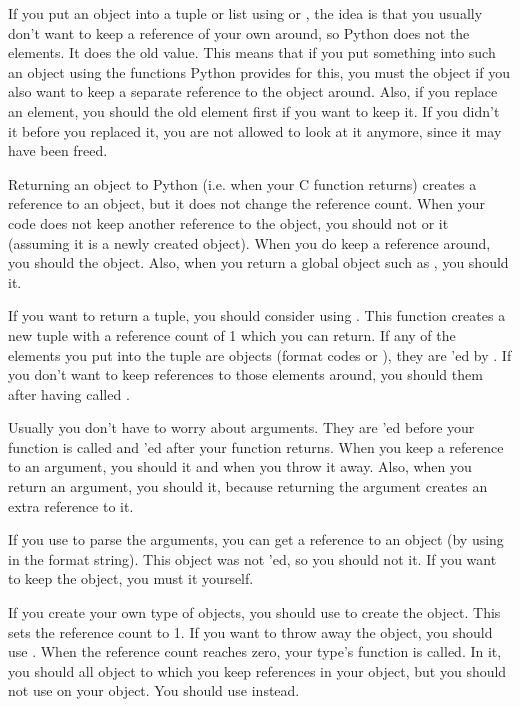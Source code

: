 If you put an object into a tuple or list using 
or , the idea is that you usually don't want to
keep a reference of your own around, so Python does not
 the elements.  It does  the old value.
This means that if you put something into such an object using the
functions Python provides for this, you must  the
object if you also want to keep a separate reference to the object around.
Also, if you replace an element, you should  the old
element first if you want to keep it.  If you didn't 
it before you replaced it, you are not allowed to look at it anymore,
since it may have been freed.

Returning an object to Python (i.e. when your C function returns)
creates a reference to an object, but it does not change the reference
count.  When your code does not keep another reference to the object,
you should not  or  it (assuming it is a
newly created object).  When you do keep a reference around, you
should  the object.  Also, when you return a global
object such as , you should  it.

If you want to return a tuple, you should consider using
.  This function creates a new tuple with a reference
count of 1 which you can return.  If any of the elements you put into
the tuple are objects (format codes  or ), they
are 'ed by .  If you don't want to keep
references to those elements around, you should  them
after having called .

Usually you don't have to worry about arguments.  They are
'ed before your function is called and
'ed after your function returns.  When you keep a
reference to an argument, you should  it and
 when you throw it away.  Also, when you return an
argument, you should  it, because returning the
argument creates an extra reference to it.

If you use  to parse the arguments, you can get a
reference to an object (by using  in the format string).  This
object was not 'ed, so you should not 
it.  If you want to keep the object, you must  it
yourself.

If you create your own type of objects, you should use 
to create the object.  This sets the reference count to 1.  If you
want to throw away the object, you should use .  When
the reference count reaches zero, your type's 
function is called.  In it, you should  all object to
which you keep references in your object, but you should not use
 on your object.  You should use  instead.


